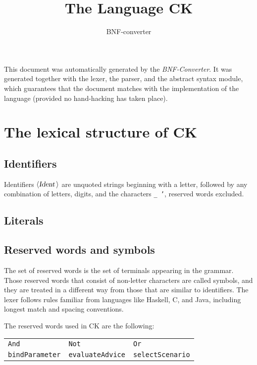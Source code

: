 \documentclass[a4paper,11pt]{article}
\author{BNF-converter}
\title{The Language CK}
\begin{document}
\maketitle

\newcommand{\emptyP}{\mbox{$\epsilon$}}
\newcommand{\terminal}[1]{\mbox{{\texttt {#1}}}}
\newcommand{\nonterminal}[1]{\mbox{$\langle \mbox{{\sl #1 }} \! \rangle$}}
\newcommand{\arrow}{\mbox{::=}}
\newcommand{\delimit}{\mbox{$|$}}
\newcommand{\reserved}[1]{\mbox{{\texttt {#1}}}}
\newcommand{\literal}[1]{\mbox{{\texttt {#1}}}}
\newcommand{\symb}[1]{\mbox{{\texttt {#1}}}}

This document was automatically generated by the {\em BNF-Converter}. It was generated together with the lexer, the parser, and the abstract syntax module, which guarantees that the document matches with the implementation of the language (provided no hand-hacking has taken place).

\section*{The lexical structure of CK}
\subsection*{Identifiers}
Identifiers \nonterminal{Ident} are unquoted strings beginning with a letter,
followed by any combination of letters, digits, and the characters {\tt \_ '},
reserved words excluded.


\subsection*{Literals}


\subsection*{Reserved words and symbols}
The set of reserved words is the set of terminals appearing in the grammar. Those reserved words that consist of non-letter characters are called symbols, and they are treated in a different way from those that are similar to identifiers. The lexer follows rules familiar from languages like Haskell, C, and Java, including longest match and spacing conventions.

The reserved words used in CK are the following: \\

\begin{tabular}{lll}
{\reserved{And}} &{\reserved{Not}} &{\reserved{Or}} \\
{\reserved{bindParameter}} &{\reserved{evaluateAdvice}} &{\reserved{selectScenario}} \\
\end{tabular}\\
\end{document}
